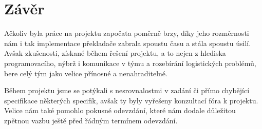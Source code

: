 \documentclass[a4paper, 11pt]{article}
\begin{document}
	\section{Závěr}
	Ačkoliv byla práce na projektu započata poměrně brzy, díky jeho rozměrnosti nám i tak implementace překladače zabrala spoustu času a stála spoustu úsilí. 
	Avšak zkušenosti, získané během řešení projektu, a to nejen z hlediska programovacího, nýbrž i komunikace v týmu a rozebírání logistických problémů, 
	bere celý tým jako velice přínosné a nenahraditelné. 

	Během projektu jsme se potýkali s nesrovnalostmi v zadání či přímo chybějící specifikace některých specifik, avšak ty byly vyřešeny konzultací fóra k projektu. 
	Velice nám také pomohlo pokusné odevzdání, které nám dodale důležitou zpětnou vazbu ještě před řádným termínem odevzdání.
	\newpage
	
	\begingroup\centering
\end{document}
